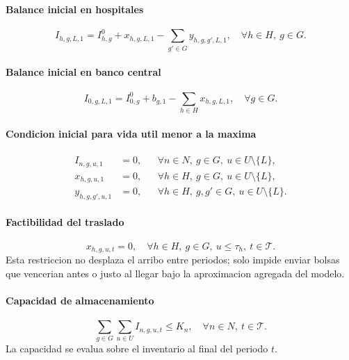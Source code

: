 \paragraph{Balance inicial en hospitales}
\begin{equation}
I_{h,g,L,1}
= I^0_{h,g} + x_{h,g,L,1}
- \sum_{g' \in G} y_{h,g,g',L,1},
\quad \forall h \in H,\ g \in G.
\end{equation}

\paragraph{Balance inicial en banco central}
\begin{equation}
I_{0,g,L,1}
= I^0_{0,g} + b_{g,1} - \sum_{h \in H} x_{h,g,L,1},
\quad \forall g \in G.
\end{equation}

\paragraph{Condicion inicial para vida util menor a la maxima}
\begin{align}
I_{n,g,u,1} &= 0,
&& \forall n \in N,\ g \in G,\ u \in U \setminus \{L\}, \\
x_{h,g,u,1} &= 0,
&& \forall h \in H,\ g \in G,\ u \in U \setminus \{L\}, \\
y_{h,g,g',u,1} &= 0,
&& \forall h \in H,\ g,g' \in G,\ u \in U \setminus \{L\}.
\end{align}

\paragraph{Factibilidad del traslado}
\begin{equation}
x_{h,g,u,t} = 0,
\quad \forall h \in H,\ g \in G,\ u \leq \tau_h,\ t \in \mathcal{T}.
\end{equation}
Esta restriccion no desplaza el arribo entre periodos; solo impide enviar bolsas que vencerian antes o justo al llegar bajo la aproximacion agregada del modelo.

\paragraph{Capacidad de almacenamiento}
\begin{equation}
\sum_{g \in G} \sum_{u \in U} I_{n,g,u,t} \leq K_n,
\quad \forall n \in N,\ t \in \mathcal{T}.
\end{equation}
La capacidad se evalua sobre el inventario al final del periodo $t$.

